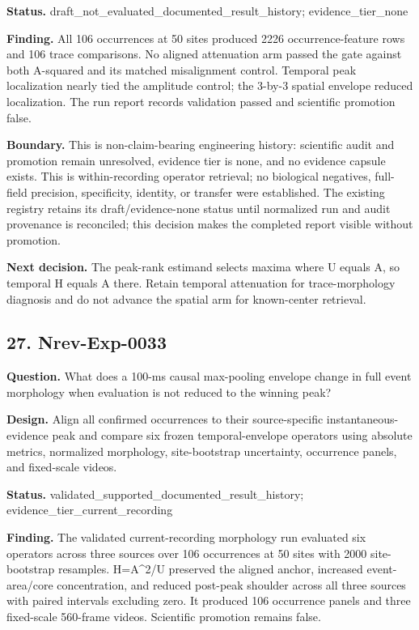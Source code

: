 \textbf{Status.} draft\_not\_evaluated\_documented\_result\_history; evidence\_tier\_none

\textbf{Finding.} All 106 occurrences at 50 sites produced 2226 occurrence-feature rows and 106 trace comparisons. No aligned attenuation arm passed the gate against both A-squared and its matched misalignment control. Temporal peak localization nearly tied the amplitude control; the 3-by-3 spatial envelope reduced localization. The run report records validation passed and scientific promotion false.

\textbf{Boundary.} This is non-claim-bearing engineering history: scientific audit and promotion remain unresolved, evidence tier is none, and no evidence capsule exists. This is within-recording operator retrieval; no biological negatives, full-field precision, specificity, identity, or transfer were established. The existing registry retains its draft/evidence-none status until normalized run and audit provenance is reconciled; this decision makes the completed report visible without promotion.

\textbf{Next decision.} The peak-rank estimand selects maxima where U equals A, so temporal H equals A there. Retain temporal attenuation for trace-morphology diagnosis and do not advance the spatial arm for known-center retrieval.

\subsection{27. Nrev-Exp-0033}

\textbf{Question.} What does a 100-ms causal max-pooling envelope change in full event morphology when evaluation is not reduced to the winning peak?

\textbf{Design.} Align all confirmed occurrences to their source-specific instantaneous-evidence peak and compare six frozen temporal-envelope operators using absolute metrics, normalized morphology, site-bootstrap uncertainty, occurrence panels, and fixed-scale videos.

\textbf{Status.} validated\_supported\_documented\_result\_history; evidence\_tier\_current\_recording

\textbf{Finding.} The validated current-recording morphology run evaluated six operators across three sources over 106 occurrences at 50 sites with 2000 site-bootstrap resamples. H=A^2/U preserved the aligned anchor, increased event-area/core concentration, and reduced post-peak shoulder across all three sources with paired intervals excluding zero. It produced 106 occurrence panels and three fixed-scale 560-frame videos. Scientific promotion remains false.


